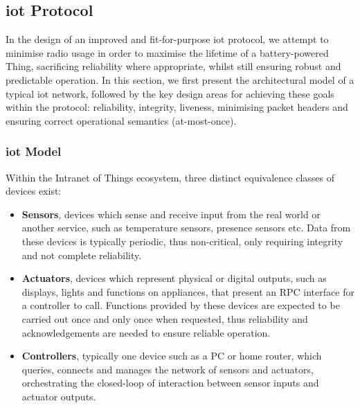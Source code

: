 \documentclass[conference]{./sty/IEEEtran}
\begin{document}
\subsection{iot Protocol} %
\label{sub:design_iot_protocol}
In the design of an improved and fit-for-purpose iot protocol, we attempt to minimise radio usage in order to maximise the lifetime of a battery-powered Thing, sacrificing reliability where appropriate, whilst still ensuring robust and predictable operation. In this section, we first present the architectural model of a typical iot network, followed by the key design areas for achieving these goals within the protocol: reliability, integrity, liveness, minimising packet headers and ensuring correct operational semantics (at-most-once). 

\subsubsection*{iot Model} %
\label{ssub:iot_model}
Within the Intranet of Things ecosystem, three distinct equivalence classes of devices exist:
\begin{itemize}
  \item \textbf{Sensors}, devices which sense and receive input from the real world or another service, such as temperature sensors, presence sensors etc. Data from these devices is typically periodic, thus non-critical, only requiring integrity and not complete reliability.
  \item \textbf{Actuators}, devices which represent physical or digital outputs, such as displays, lights and functions on appliances, that present an RPC interface for a controller to call. Functions provided by these devices are expected to be carried out once and only once when requested, thus reliability and acknowledgements are needed to ensure reliable operation. 
  \item \textbf{Controllers}, typically one device such as a PC or home router, which queries, connects and manages the network of sensors and actuators, orchestrating the closed-loop of interaction between sensor inputs and actuator outputs.
\end{itemize}
\end{document}
